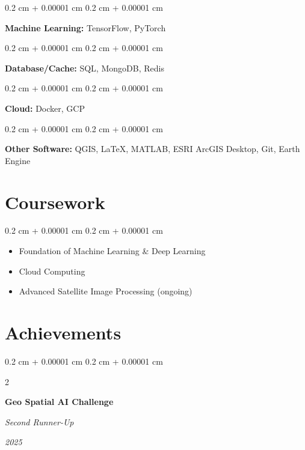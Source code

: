 \documentclass[10pt, letterpaper]{article}
\newenvironment{highlights}{
    \begin{itemize}[
        topsep=0.10 cm,
        parsep=0.10 cm,
        partopsep=0pt,
        itemsep=0pt,
        leftmargin=0.4 cm + 10pt
    ]
}{
    \end{itemize}
} %
\newenvironment{onecolentry}{
    \begin{adjustwidth}{
        0.2 cm + 0.00001 cm
    }{
        0.2 cm + 0.00001 cm
    }
}{
    \end{adjustwidth}
} %
\newenvironment{twocolentry}[2][]{
    \onecolentry
    \def\secondColumn{#2}
    \setcolumnwidth{\fill, 4.5 cm}
    \begin{paracol}{2}
}{
    \switchcolumn \raggedleft \secondColumn
    \end{paracol}
    \endonecolentry
} %
\begin{document}
        \vspace{0.2 cm}

        \begin{onecolentry}
            \textbf{Machine Learning:} TensorFlow, PyTorch
        \end{onecolentry}

        \vspace{0.2 cm}

        \begin{onecolentry}
            \textbf{Database/Cache:} SQL, MongoDB, Redis
        \end{onecolentry}

        \vspace{0.2 cm}

        \begin{onecolentry}
            \textbf{Cloud:} Docker, GCP
        \end{onecolentry}

        \vspace{0.2 cm}

        \begin{onecolentry}
            \textbf{Other Software:} QGIS, LaTeX, MATLAB, ESRI ArcGIS Desktop, Git, Earth Engine
        \end{onecolentry}



    \section{Coursework}


        \begin{onecolentry}
            \begin{highlights}
                \item Foundation of Machine Learning \& Deep Learning
                \item Cloud Computing
                \item Advanced Satellite Image Processing (ongoing)
            \end{highlights}
        \end{onecolentry}

        \vspace{0.2 cm}

    \section{Achievements}


        \begin{twocolentry}{
        \textit{2025}}
            \textbf{Geo Spatial AI Challenge}
            
            \textit{Second Runner-Up}
        \end{twocolentry}
\end{document}

